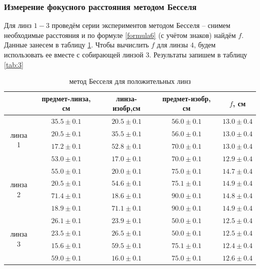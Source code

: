 \documentclass[a4paper,12pt]{article}
\begin{document}
\subsubsection*{Измерение фокусного расстояния методом Бесселя}
Для линз $1-3$ проведём серии экспериментов методом Бесселя -- снимем необходимые расстояния и по формуле \eqref{formula6} (с учётом знаков) найдём $f$. Данные занесем в таблицу \ref{tab:2}. Чтобы вычислить $f$ для линзы $4$, будем использовать ее вместе с собирающей линзой $3$. Результаты запишем в таблицу \ref{tab:3}
\begin{table} [!hbp] 
	\centering
	\begin{tabular}{|c|c|c|c|c|} \hline
		& предмет-линза, см & линза-изобр,см & предмет-изобр, см& $f$, см  \\\hline
		\multirow{4}{*}{линза 1}    & $35.5\pm0.1$ & $20.5\pm0.1$  & $56.0\pm0.1$& $13.0\pm 0.4$                             \\\cline{2-5}
		& $20.5\pm0.1$ & $35.5\pm0.1$  & $56.0\pm0.1$& $13.0\pm 0.4$  \\\cline{2-5}
		& $17.2\pm0.1$ & $52.8\pm0.1$  & $70.0\pm0.1$& $13.0\pm0.4$  \\\cline{2-5}
		& $53.0\pm0.1$ & $17.0\pm0.1$  & $70.0\pm0.1$& $12.9\pm0.4$  \\\hline
		\multirow{4}{*}{линза 2}        & $55.0\pm0.1$& $20.0\pm0.1$& $75.0\pm0.1$& $14.7\pm 0.4$                                    \\\cline{2-5}
		& $20.5\pm0.1$& $54.6\pm0.1$& $75.1\pm0.1$& $14.9\pm 0.4$            \\\cline{2-5}
		& $71.4\pm0.1$& $18.6\pm0.1$& $90.0\pm0.1$& $14.8\pm 0.4$           \\\cline{2-5}
		& $18.9\pm0.1$& $71.1\pm0.1$& $90.0\pm0.1$& $14.9\pm 0.4$           \\\hline
		\multirow{4}{*}{линза 3}       & $26.1\pm0.1$& $23.9\pm0.1$& $50.0\pm0.1$& $12.5\pm 0.4$                                    \\\cline{2-5}
		& $23.5\pm0.1$& $26.5\pm0.1$& $50.0\pm0.1$& $12.5\pm 0.4$            \\\cline{2-5}
		& $15.6\pm0.1$& $59.5\pm0.1$& $75.1\pm0.1$& $12.4\pm 0.4$            \\\cline{2-5}
		& $59.0\pm0.1$& $16.0\pm0.1$& $75.0\pm0.1$& $12.6\pm 0.4$          \\\hline
		
	\end{tabular}
	\caption{метод Бесселя для положительных линз}
	\label{tab:2}
\end{table}
\end{document}

